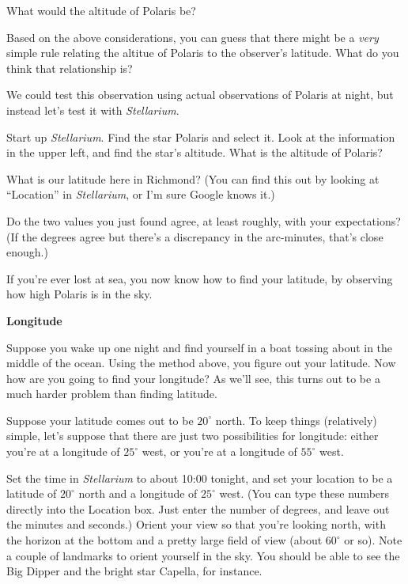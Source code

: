 \answerspace{1in}

What would the altitude of Polaris be?

\answerspace{2in}

Based on the above considerations, you can guess that there might
be a \textit{very} simple rule relating the altitue of Polaris
to the observer's latitude. What do you think that relationship is?

\answerspace{1in}

We could test this observation using actual observations of Polaris at
night, but instead let's test it with \textit{Stellarium}. 

Start up \textit{Stellarium}. 
Find the star Polaris and select it. Look at the information in
the upper left, and find the star's altitude. What is the altitude of
Polaris?

\answerspace{1in}

What is our latitude here in Richmond? (You can find this out by looking
at ``Location'' in \textit{Stellarium}, or I'm sure Google knows it.)

\answerspace{1in}

\pagebreak[2]

Do the two values you just found agree, at least roughly, with your
expectations? (If the degrees agree but there's a discrepancy in the
arc-minutes, that's close enough.)

\answerspace{1in}

If you're ever lost at sea, you now know how to find your latitude,
by observing how high Polaris is in the sky.

{\bf Longitude}

Suppose you wake up one night and find yourself in a boat tossing about
in the middle of the ocean. Using the method above, you figure out
your latitude. Now how are you going to find your longitude? As we'll see,
this
turns out to be a much harder problem than finding latitude.

Suppose your
latitude comes out to be $20^\circ$ north. 
To keep things (relatively) simple, let's suppose that there
are just two possibilities
for longitude: either you're at a longitude of $25^\circ$ west,
or you're at a longitude of $55^\circ$ west. 

Set the time in \textit{Stellarium} to about 10:00 tonight,
and set your location to be a latitude of $20^\circ$ north and
a longitude of $25^\circ$ west. (You can type these numbers
directly into the Location box. Just enter the
number of degrees, and leave out the minutes and
seconds.) Orient your view so that you're looking north,
with the horizon at the bottom and a pretty large 
field of view (about $60^\circ$ or so). Note a couple of
landmarks to orient yourself in the sky. You should be able
to see the Big Dipper and the bright star Capella, for
instance.

